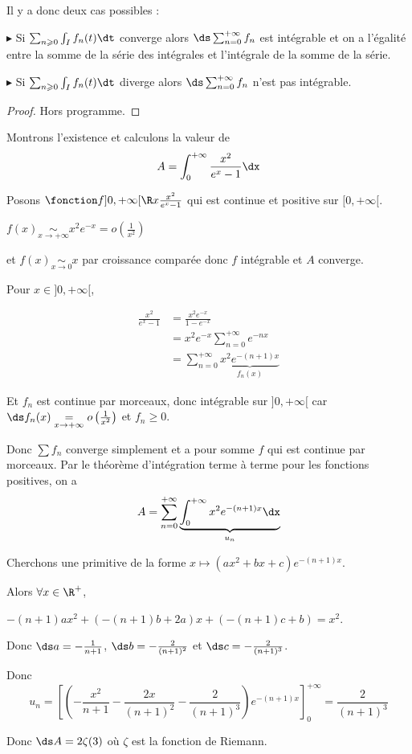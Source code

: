 Il y a donc deux cas possibles : 

$\blacktriangleright$ Si $\sum_{n \geqslant 0} \int_I f_n(t) \dt$ converge alors $\ds \sum_{n = 0}^{+ \infty} f_n$ est intégrable 
et on a l'égalité entre la somme de la série des intégrales et l'intégrale de la somme de la série.

\avspace $\blacktriangleright$ Si $\sum_{n \geqslant 0} \int_I f_n(t) \dt$ diverge alors $\ds \sum_{n = 0}^{+ \infty} f_n$ n'est pas intégrable.

\begin{proof}
    Hors programme. 
\end{proof}

\begin{exemple}
    Montrons l'existence et calculons la valeur de
    $$ A = \int_{0}^{+ \infty} \frac{x^2}{e^x - 1} \dx$$ 

    Posons $\fonction f {]0, + \infty[}{\R}{x}{\frac{x^2}{e^x - 1}}$ qui est continue et positive sur $[0, + \infty[$.

    $f(x) \underset{x \to + \infty}{\sim} x^2 e^{-x} = o\left( \frac 1 {x^2} \right)$ 
    
    et $f(x) \underset{x \to 0 }{\sim} x$ par croissance comparée donc $f$ intégrable et $A$ converge. 

    \avspace Pour $x \in ]0, + \infty[$, 
    
    \begin{align}
        \frac{x^2}{e^x - 1 } & = \frac{x^2 e^{-x}}{1 - e^{-x}} \\
        & = x^2 e^{-x} \sum_{n = 0}^{+ \infty} e^{-nx} \\
        & = \sum_{n = 0}^{+ \infty} \underbrace{x^2 e^{-(n + 1)x}}_{f_n(x)}
    \end{align}

    Et $f_n$ est continue par morceaux, donc intégrable sur $]0, + \infty[$ car \\
    $\ds f_n(x) \underset{x \to + \infty}{=} o\left( \frac 1 {x^2} \right)$ et $f_n \geqslant 0$.

    Donc $\sum f_n$ converge simplement et a pour somme $f$ qui est continue par morceaux.
    Par le théorème d'intégration terme à terme pour les fonctions positives, on a
    $$A = \sum_{n = 0}^{+ \infty} \underbrace{\int_0^{+ \infty} x^2 e^{-(n + 1)x} \dx}_{u_n}$$

    Cherchons une primitive de la forme $x \mapsto (ax^2 + bx + c)e^{-(n + 1)x}$.

    Alors $\forall x \in \R^+$,

    $-(n+1)ax^2 + (-(n + 1)b + 2a)x + (-(n + 1)c + b) = x^2$.

    Donc $\ds a = - \frac 1 {n + 1}$, $\ds b = - \frac 2 {(n + 1)^2}$ et $\ds c = - \frac 2 {(n + 1)^3}$.

    Donc 
    $$u_n = \left[ \left( - \frac{x^2}{n + 1} - \frac{2x}{(n + 1)^2} - \frac{2}{(n + 1)^3} \right) e^{-(n + 1)x} \right]_0^{+ \infty} = \frac{2}{(n + 1)^3}$$

    Donc $\ds A = 2 \zeta(3)$ où $\zeta$ est la fonction de Riemann.
\end{exemple}

